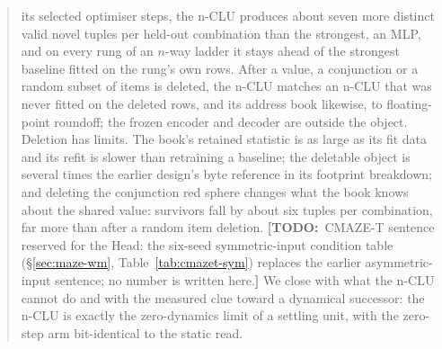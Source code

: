 \documentclass{article} %
\newcommand{\TODO}[1]{{\color{orange}\textbf{[TODO:}~#1\textbf{]}}}
\begin{document}
\begin{abstract}
its selected optimiser steps, the n-CLU produces about seven more distinct
valid novel tuples per held-out combination than the strongest, an MLP, and on every rung of an $n$-way ladder
it stays ahead of the strongest baseline fitted on the rung's own rows.
After a value, a conjunction or a random subset of items is deleted, the n-CLU matches an n-CLU that
was never fitted on the deleted rows, and its address book likewise, to floating-point roundoff; the frozen encoder and decoder are outside the
object. Deletion has limits. The book's retained statistic is %
as large as its fit data and its refit is slower than retraining a baseline; the deletable object is several times %
the earlier design's byte reference in its footprint breakdown; and deleting the conjunction red sphere %
changes what the book knows about the shared value: survivors fall by about six tuples per %
combination, far more than after a random item deletion. %
\TODO{CMAZE-T sentence reserved for the Head: the six-seed symmetric-input condition table
(\S\ref{sec:maze-wm}, Table~\ref{tab:cmazet-sym}) replaces the earlier asymmetric-input sentence; no
number is written here.}
We close with what the n-CLU cannot do and with the measured clue toward a
dynamical successor: the n-CLU is exactly the zero-dynamics limit of a settling unit, with
the zero-step arm bit-identical to the static read. %
\end{abstract}
\end{document}
